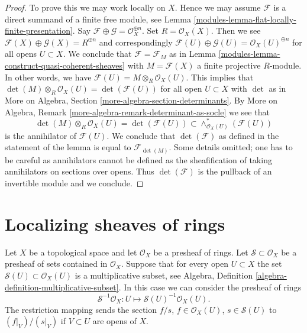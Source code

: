 \begin{proof}

To prove this we may work locally on $X$. Hence we may assume $\mathcal{F}$
is a direct summand of a finite free module, see
Lemma \ref{modules-lemma-flat-locally-finite-presentation}. Say
$\mathcal{F} \oplus \mathcal{G} = \mathcal{O}_X^{\oplus n}$.
Set $R = \mathcal{O}_X(X)$. Then we see
$\mathcal{F}(X) \oplus \mathcal{G}(X) = R^{\oplus n}$
and correspondingly
$\mathcal{F}(U) \oplus \mathcal{G}(U) = \mathcal{O}_X(U)^{\oplus n}$
for all opens $U \subset X$.
We conclude that $\mathcal{F} = \mathcal{F}_M$ as in
Lemma \ref{modules-lemma-construct-quasi-coherent-sheaves}
with $M = \mathcal{F}(X)$ a finite projective $R$-module.
In other words, we have $\mathcal{F}(U) = M \otimes_R \mathcal{O}_X(U)$.
This implies that
$\det(M) \otimes_R \mathcal{O}_X(U) = \det(\mathcal{F}(U))$
for all open $U \subset X$ with $\det$ as in
More on Algebra, Section \ref{more-algebra-section-determinants}. By
More on Algebra, Remark \ref{more-algebra-remark-determinant-as-socle}
we see that
$$
\det(M) \otimes_R \mathcal{O}_X(U) =
\det(\mathcal{F}(U)) \subset
\wedge^*_{\mathcal{O}_X(U)}(\mathcal{F}(U))
$$
is the annihilator of $\mathcal{F}(U)$. We conclude that
$\det(\mathcal{F})$ as defined in the statement of the lemma
is equal to $\mathcal{F}_{\det(M)}$. Some details omitted; one has
to be careful as annihilators cannot be defined as the sheafification
of taking annihilators on sections over opens. Thus $\det(\mathcal{F})$
is the pullback of an invertible module and we conclude.
\end{proof}

\section{Localizing sheaves of rings}
\label{modules-section-localizing-sheaves-rings}
Let $X$ be a topological space and let $\mathcal{O}_X$ be a
presheaf of rings. Let $\mathcal{S} \subset \mathcal{O}_X$
be a presheaf of sets contained in $\mathcal{O}_X$.
Suppose that for every open $U \subset X$ the set
$\mathcal{S}(U) \subset \mathcal{O}_X(U)$ is a multiplicative subset, see
Algebra, Definition \ref{algebra-definition-multiplicative-subset}.
In this case we can consider the presheaf of rings
$$
\mathcal{S}^{-1}\mathcal{O}_X :
U \longmapsto \mathcal{S}(U)^{-1}\mathcal{O}_X(U).
$$
The restriction mapping sends the section $f/s$, $f \in \mathcal{O}_X(U)$,
$s \in \mathcal{S}(U)$ to $(f|_V)/(s|_V)$ if $V \subset U$ are opens
of $X$.

